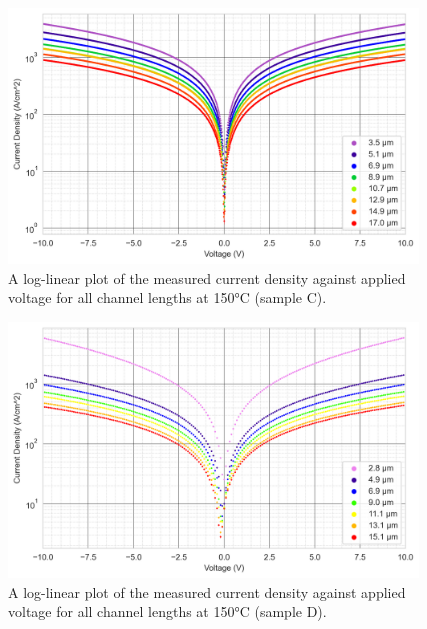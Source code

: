 \begin{refsection}
\begin{figure}[h]
    \centering
    \includegraphics[width=0.97\textwidth]{Sample C 2019/10V_Current_Density_vs_Voltage_Temperature_250_log.png}
    \caption{A log-linear plot of the measured current density against applied voltage for all channel lengths at 150\si{\degreeCelsius} (sample C).}
    \label{fig:10V_current_density_150_C}
\end{figure}
\begin{figure}[h]
    \centering
    \includegraphics[width=0.97\textwidth]{Sample D 2019/10V_Current_Density_vs_Voltage_Temperature_250_log.png}
    \caption{A log-linear plot of the measured current density against applied voltage for all channel lengths at 150\si{\degreeCelsius} (sample D).}
    \label{fig:10V__B_current_density_150_D}
\end{figure}


\end{refsection}
